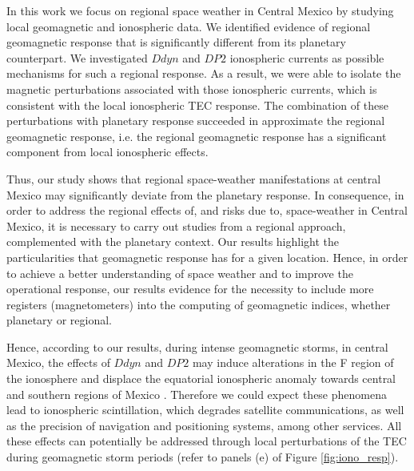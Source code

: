 \documentclass[a4paper,fleqn]{cas-dc}
\begin{document}


In this work we focus on regional space weather in Central Mexico by studying local geomagnetic and ionospheric data. We identified evidence of regional geomagnetic response that is significantly different from its planetary counterpart. We investigated $Ddyn$ and $DP2$ ionospheric currents as possible mechanisms for such a regional response. As a result, we were able to isolate the magnetic perturbations associated with those ionospheric currents, which is consistent with the local ionospheric TEC response. The combination of these perturbations with planetary response succeeded in approximate the regional geomagnetic response, i.e. the regional geomagnetic response has a significant component from local ionospheric effects.

Thus, our study shows that regional space-weather manifestations at central Mexico may significantly deviate from the planetary response. In consequence, in order to address the regional effects of, and risks due to, space-weather in Central Mexico, it is necessary to carry out studies from a regional approach, complemented with the planetary context. Our results highlight the particularities that geomagnetic response has for a given location. Hence, in order to achieve a better understanding of space weather and to improve the operational response, our results evidence for the necessity to include more registers (magnetometers) into the computing of geomagnetic indices, whether planetary or regional.

Hence, according to our results, during intense geomagnetic storms, in central Mexico, the effects of $Ddyn$ and $DP2$ may induce alterations in the F region of the ionosphere and displace the equatorial ionospheric anomaly towards central and southern regions of Mexico \citep[as showed by][]{dramaria_13}. Therefore we could expect these phenomena lead to ionospheric scintillation, which degrades satellite communications, as well as the precision of navigation and positioning systems, among other services. All these effects can potentially be addressed through local perturbations of the TEC during geomagnetic storm periods (refer to panels (e) of Figure \ref{fig:iono_resp}).
\end{document}
